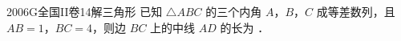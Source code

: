 
\begin{problem}{2006}{G}{全国II卷}{14}{解三角形}
已知 $\triangle ABC$ 的三个内角 $A$，$B$，$C$ 成等差数列，且 $AB=1$，$BC=4$，则边 $BC$ 上的中线 $AD$ 的长为 \underline{\hspace{4em}}．
\end{problem}